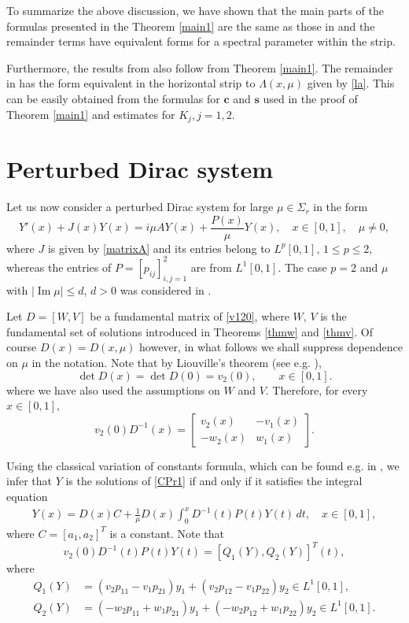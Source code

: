 \documentclass[11pt]{amsart}
\theoremstyle{plain}
\theoremstyle{definition}
\theoremstyle{remark}
\numberwithin{equation}{section}
\renewcommand\Im{\operatorname{Im}}
\begin{document}
To summarize the above discussion, we have shown that the main parts of the formulas presented in the
Theorem \ref{main1} are the same as those in \cite[Lemma 2.2]{Rzep21}
and the remainder terms have equivalent forms for a spectral parameter within the strip.

Furthermore, the results from \cite[Theorem 1.1]{Rzep21} also follow from Theorem \ref{main1}.
The remainder in \cite[Theorem 1.1]{Rzep21} has the form equivalent in the horizontal strip to $\Lambda(x,\mu)$ given by \eqref{la}.
This can be easily obtained from the formulas for $\mathbf{c}$ and $\mathbf{s}$ used in the proof of Theorem \ref{main1} and estimates for $K_j, j=1,2$.


\section{Perturbed Dirac system}

Let us now consider a perturbed Dirac system for large $\mu \in \Sigma_r $ in the form
\begin{equation}\label{CPr1}
Y'(x)+J(x)Y(x)=i \mu A Y(x)+
\frac{P(x)}{\mu}Y(x),\quad x\in [0,1], \quad \mu \neq 0,
\end{equation}
where $J$ is given by \eqref{matrixA} and its entries belong to $L^p[0,1]$, $1\leq p \le 2$, whereas the entries of
$P=[p_{ij}]_{i,j=1}^2$ are from $L^1[0,1]$.
The case $p=2$ and $\mu$ with $|\Im\mu| \leq d$, $d>0$ was
considered in \cite{GRZ1}.

Let $D = [W,V]$ be a fundamental matrix of \eqref{v120}, where
$W$, $V$ is the fundamental set of solutions introduced in Theorems \ref{thmw} and \ref{thmv}.
Of course $D(x)=D(x,\mu)$ however, in what follows we shall suppress dependence on $\mu$ in the notation.
Note that by Liouville's theorem (see e.g. \cite[Theorem 1.2.2]{Zettl}),
$$
\det D(x)=\det D(0)=v_2(0), \qquad x\in [0,1].
$$
where we have also used the assumptions on  $W$ and $V$.
Therefore, for every $x\in [0,1],$
\begin{equation}\label{Dminus}
v_2(0)D^{-1}(x)=\left[\begin{array}{cc}
v_2(x) & -v_1(x)\\
-w_2(x) & w_1(x)
\end{array}\right].
\end{equation}

Using the classical variation of constants formula, which can be found e.g. in \cite[Theorem 1.3.1]{Zettl},
we infer that $Y$ is the solutions of
\eqref{CPr1} if and only if it satisfies the integral equation
\begin{align}\label{IntAm}
Y(x)=D(x)C+\frac{1}{\mu}D(x)\int_0^x D^{-1}(t) P(t) Y(t)\,dt,\quad x\in [0,1],
\end{align}
where $C=[a_1,a_2]^T$ is a constant.
Note that
\[
 v_2(0)D^{-1}(t) P(t) Y(t)=[Q_1(Y),Q_2(Y)]^T(t),
 \]
where
 \begin{align*}
Q_1(Y)& =
(v_2p_{11}-v_1p_{21}) y_1+(v_2p_{12}-v_1p_{22})y_2 \in L^1[0,1],
\\
Q_2(Y)&=(- w_2p_{11}+w_1p_{21})y_1+(-w_2p_{12}+w_1p_{22})y_2 \in L^1[0,1].
\end{align*}
\end{document}
